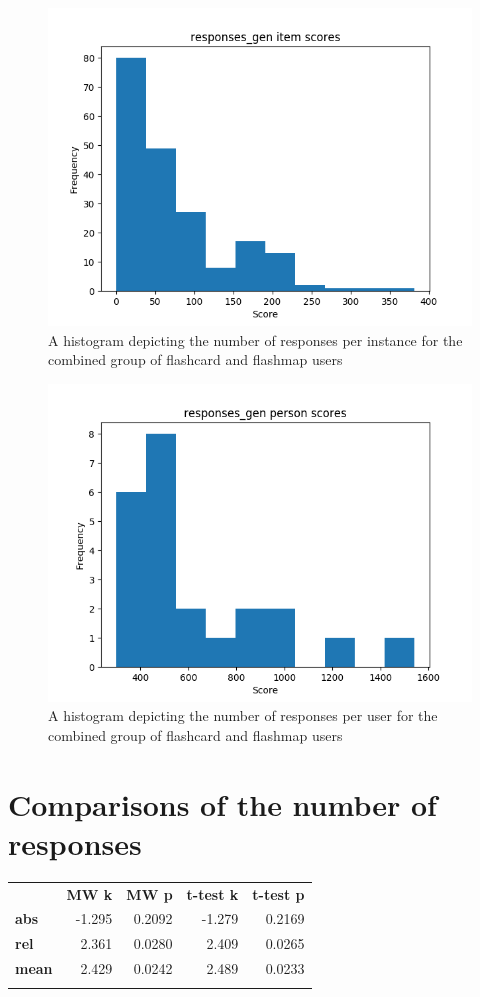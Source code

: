 \begin{figure}
    \centering
    \includegraphics[width=.7\textwidth]{img/responses_gen_diff.png}
    \caption{A histogram depicting the number of responses per instance for the combined group of flashcard and flashmap users}
    \label{fig:responses_gen_diff}
\end{figure}
\begin{figure}
    \centering
    \includegraphics[width=.7\textwidth]{img/responses_gen_abil.png}
    \caption{A histogram depicting the number of responses per user for the combined group of flashcard and flashmap users}
    \label{fig:responses_gen_abil}
\end{figure}

\section{Comparisons of the number of responses}

\begin{longtable}[c]{@{}lrrrr@{}}
\toprule\addlinespace
& \textbf{MW k} & \textbf{MW p} &
\textbf{t-test k} & \textbf{t-test p}
\\\addlinespace
\midrule
\textbf{abs} & -1.295 & 0.2092 & -1.279 & 0.2169
\\\addlinespace
\textbf{rel} & 2.361 & 0.0280 & 2.409 & 0.0265
\\\addlinespace
\textbf{mean} & 2.429 & 0.0242 & 2.489 & 0.0233
\\\addlinespace
\bottomrule
    \label{tab:responses_comp}
\end{longtable}

